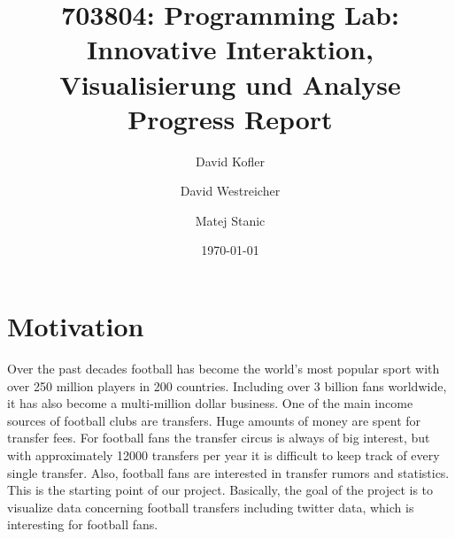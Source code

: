 \documentclass{article}
\begin{document}
\title{703804: Programming Lab: Innovative Interaktion,
Visualisierung und Analyse\\ Progress Report}
\author{David Kofler \and David Westreicher \and Matej Stanic}
\date{\today}
\maketitle

\section{Motivation}
Over the past decades football has become the world's most popular sport with over 250 million players in 200 countries. Including over 3 billion fans worldwide, it has also become a multi-million dollar business. One of the main income sources of football clubs are transfers. Huge amounts of money are spent for transfer fees. For football fans the transfer circus is always of big interest, but with approximately 12000 transfers per year it is difficult to keep track of every single transfer. Also, football fans are interested in transfer rumors and statistics. This is the starting point of our project. Basically, the goal of the project is to visualize data concerning football transfers including twitter data, which is interesting for football fans.
\end{document}
